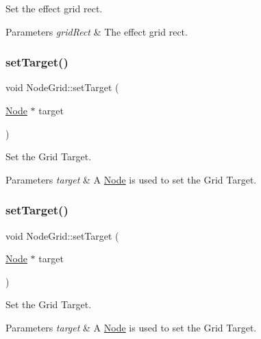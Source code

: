 Set the effect grid rect. 


\begin{DoxyParams}{Parameters}
{\em grid\+Rect} & The effect grid rect. \\
\hline
\end{DoxyParams}
\mbox{\label{classNodeGrid_a1a54c6570d25c30a53e8c9291ddbc538}} 
\subsubsection{\texorpdfstring{set\+Target()}{setTarget()}\hspace{0.1cm}{\footnotesize\ttfamily [1/2]}}
{\footnotesize\ttfamily void Node\+Grid\+::set\+Target (\begin{DoxyParamCaption}\item[{\hyperlink{classNode}{Node} $\ast$}]{target }\end{DoxyParamCaption})}

Set the Grid Target.


\begin{DoxyParams}{Parameters}
{\em target} & A \hyperlink{classNode}{Node} is used to set the Grid Target. \\
\hline
\end{DoxyParams}
\mbox{\label{classNodeGrid_a1a54c6570d25c30a53e8c9291ddbc538}} 
\subsubsection{\texorpdfstring{set\+Target()}{setTarget()}\hspace{0.1cm}{\footnotesize\ttfamily [2/2]}}
{\footnotesize\ttfamily void Node\+Grid\+::set\+Target (\begin{DoxyParamCaption}\item[{\hyperlink{classNode}{Node} $\ast$}]{target }\end{DoxyParamCaption})}

Set the Grid Target.


\begin{DoxyParams}{Parameters}
{\em target} & A \hyperlink{classNode}{Node} is used to set the Grid Target. \\
\hline
\end{DoxyParams}
\mbox{\label{classNodeGrid_afb46783d7e7fdaf8e3d58c0dde9ebd21}} 

